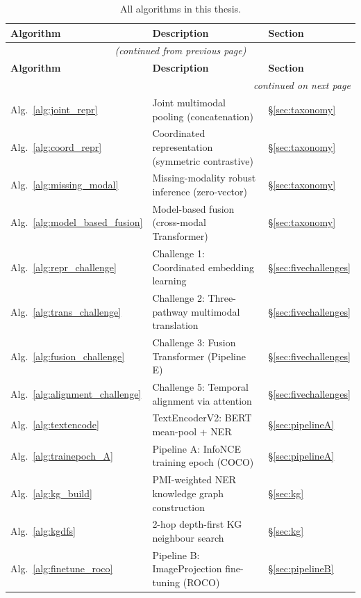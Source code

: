 \documentclass[12pt,a4paper]{article}
\theoremstyle{definition}
\theoremstyle{plain}
\theoremstyle{remark}
\begin{document}
\begin{longtable}{p{4.0cm}p{7.0cm}p{3.2cm}}
\caption{All algorithms in this thesis.}\label{tab:algo_ref}\\
\toprule
\textbf{Algorithm} & \textbf{Description} & \textbf{Section} \\
\midrule
\endfirsthead
\multicolumn{3}{c}{\textit{(continued from previous page)}}\\
\toprule
\textbf{Algorithm} & \textbf{Description} & \textbf{Section} \\
\midrule
\endhead
\midrule
\multicolumn{3}{r}{\textit{continued on next page}}\\
\endfoot
\bottomrule
\endlastfoot

Alg.~\ref{alg:joint_repr} & Joint multimodal pooling (concatenation) & \S\ref{sec:taxonomy} \\[3pt]
Alg.~\ref{alg:coord_repr} & Coordinated representation (symmetric contrastive) & \S\ref{sec:taxonomy} \\[3pt]
Alg.~\ref{alg:missing_modal} & Missing-modality robust inference (zero-vector) & \S\ref{sec:taxonomy} \\[3pt]
Alg.~\ref{alg:model_based_fusion} & Model-based fusion (cross-modal Transformer) & \S\ref{sec:taxonomy} \\[3pt]
Alg.~\ref{alg:repr_challenge} & Challenge 1: Coordinated embedding learning & \S\ref{sec:fivechallenges} \\[3pt]
Alg.~\ref{alg:trans_challenge} & Challenge 2: Three-pathway multimodal translation & \S\ref{sec:fivechallenges} \\[3pt]
Alg.~\ref{alg:fusion_challenge} & Challenge 3: Fusion Transformer (Pipeline E) & \S\ref{sec:fivechallenges} \\[3pt]
Alg.~\ref{alg:alignment_challenge} & Challenge 5: Temporal alignment via attention & \S\ref{sec:fivechallenges} \\[3pt]
Alg.~\ref{alg:textencode} & TextEncoderV2: BERT mean-pool + NER & \S\ref{sec:pipelineA} \\[3pt]
Alg.~\ref{alg:trainepoch_A} & Pipeline A: InfoNCE training epoch (COCO) & \S\ref{sec:pipelineA} \\[3pt]
Alg.~\ref{alg:kg_build} & PMI-weighted NER knowledge graph construction & \S\ref{sec:kg} \\[3pt]
Alg.~\ref{alg:kgdfs} & 2-hop depth-first KG neighbour search & \S\ref{sec:kg} \\[3pt]
Alg.~\ref{alg:finetune_roco} & Pipeline B: ImageProjection fine-tuning (ROCO) & \S\ref{sec:pipelineB} \\[3pt]

\end{longtable}
\end{document}
